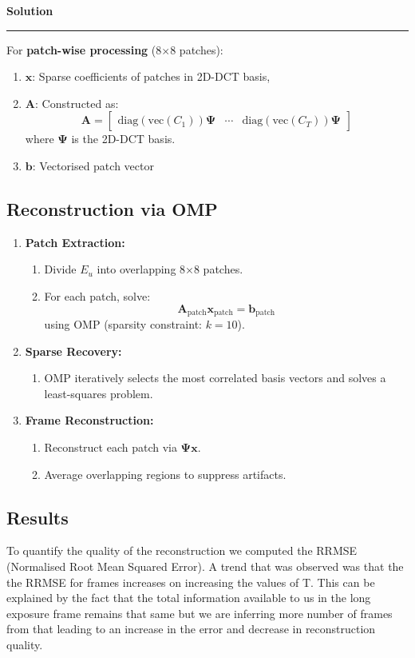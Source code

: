 \documentclass[a4paper,12pt]{article}
\newenvironment{solution}[2][]{%
    \begin{mdframed}[linecolor=blue!70!black, linewidth=2pt, roundcorner=10pt, backgroundcolor=yellow!10!white, skipabove=12pt, skipbelow=12pt]%
        \textbf{\large #2}
        \par\noindent\rule{\textwidth}{0.4pt}
}{
    \end{mdframed}
}
\begin{document}
\begin{solution}{Solution}
\noindent For \textbf{patch-wise processing} (8$\times$8 patches):
\begin{enumerate}
    \item $\mathbf{x}$: Sparse coefficients of patches in 2D-DCT basis,
    \item $\mathbf{A}$: Constructed as:
    \[
    \mathbf{A} = \begin{bmatrix}
    \text{diag}(\text{vec}(C_1)) \mathbf{\Psi} & \cdots & \text{diag}(\text{vec}(C_T)) \mathbf{\Psi}
    \end{bmatrix}
    \]
    where $\mathbf{\Psi}$ is the 2D-DCT basis.
    \item $\mathbf{b}$: Vectorised patch vector
\end{enumerate}

\subsection{Reconstruction via OMP}
\begin{enumerate}
    \item \textbf{Patch Extraction:}
    \begin{enumerate}
        \item Divide $E_u$ into overlapping 8$\times$8 patches.
        \item For each patch, solve:
        \[
        \mathbf{A}_{\text{patch}} \mathbf{x}_{\text{patch}} = \mathbf{b}_{\text{patch}}
        \]
        using OMP (sparsity constraint: $k = 10$).
    \end{enumerate}
    
    \item \textbf{Sparse Recovery:}
    \begin{enumerate}
        \item OMP iteratively selects the most correlated basis vectors and solves a least-squares problem.
    \end{enumerate}
    
    \item \textbf{Frame Reconstruction:}
    \begin{enumerate}
        \item Reconstruct each patch via $\mathbf{\Psi x}$.
        \item Average overlapping regions to suppress artifacts.
    \end{enumerate}
\end{enumerate}

\subsection{Results}

\noindent To quantify the quality of the reconstruction we computed the RRMSE (Normalised Root Mean Squared Error). A trend that was observed was that the the RRMSE for frames increases on increasing the values of T. This can be explained by the fact that the total information available to us in the long exposure frame remains that same but we are inferring more number of frames from that leading to an increase in the error and decrease in reconstruction quality. 

\end{solution}
\end{document}
